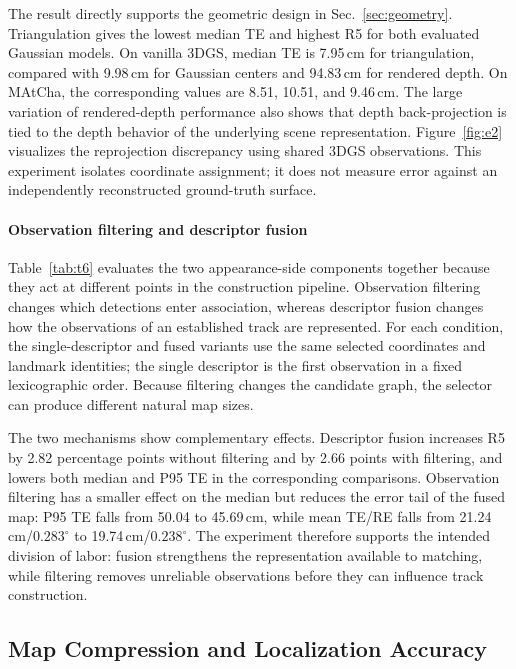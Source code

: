 The result directly supports the geometric design in Sec.~\ref{sec:geometry}. Triangulation gives the lowest median TE and highest R5 for both evaluated Gaussian models. On vanilla 3DGS, median TE is 7.95\,cm for triangulation, compared with 9.98\,cm for Gaussian centers and 94.83\,cm for rendered depth. On MAtCha, the corresponding values are 8.51, 10.51, and 9.46\,cm. The large variation of rendered-depth performance also shows that depth back-projection is tied to the depth behavior of the underlying scene representation. Figure~\ref{fig:e2} visualizes the reprojection discrepancy using shared 3DGS observations. This experiment isolates coordinate assignment; it does not measure error against an independently reconstructed ground-truth surface.



\paragraph{Observation filtering and descriptor fusion}
Table~\ref{tab:t6} evaluates the two appearance-side components together because they act at different points in the construction pipeline. Observation filtering changes which detections enter association, whereas descriptor fusion changes how the observations of an established track are represented. For each condition, the single-descriptor and fused variants use the same selected coordinates and landmark identities; the single descriptor is the first observation in a fixed lexicographic order. Because filtering changes the candidate graph, the selector can produce different natural map sizes.

The two mechanisms show complementary effects. Descriptor fusion increases R5 by 2.82 percentage points without filtering and by 2.66 points with filtering, and lowers both median and P95 TE in the corresponding comparisons. Observation filtering has a smaller effect on the median but reduces the error tail of the fused map: P95 TE falls from 50.04 to 45.69\,cm, while mean TE/RE falls from 21.24\,cm/$0.283^\circ$ to 19.74\,cm/$0.238^\circ$. The experiment therefore supports the intended division of labor: fusion strengthens the representation available to matching, while filtering removes unreliable observations before they can influence track construction.

\subsection{Map Compression and Localization Accuracy}
\label{sec:selection-results}



